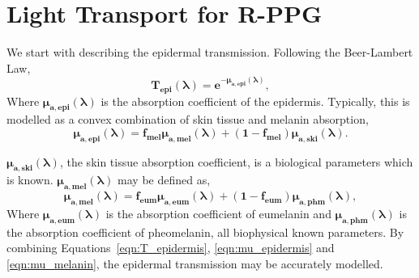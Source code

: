 \section{Light Transport for R-PPG}

We start with describing the epidermal transmission. Following the Beer-Lambert Law, 
\begin{equation} \label{eqn:T_epidermis}
    \mathbf{T_{epi}(\boldsymbol{\lambda})=e^{-\boldsymbol\mu_{a,epi}(\boldsymbol\lambda)}},
\end{equation}
Where $\mathbf{\boldsymbol\mu_{a,epi}(\boldsymbol\lambda)}$ is the absorption coefficient of the epidermis. Typically, this is modelled as a convex combination of skin tissue and melanin absorption,
\begin{equation} \label{eqn:mu_epidermis}
    \mathbf{\boldsymbol\mu_{a,epi}(\boldsymbol\lambda)=f_{mel}\boldsymbol\mu_{a,mel}(\boldsymbol\lambda)+(1-f_{mel})\boldsymbol\mu_{a,ski}(\boldsymbol\lambda)}.
\end{equation}

$\mathbf{\boldsymbol\mu_{a,ski}(\boldsymbol\lambda)}$, the skin tissue absorption coefficient, is a biological parameters which is known. $\mathbf{\boldsymbol\mu_{a,mel}(\boldsymbol\lambda)}$ may be defined as,
\begin{equation} \label{eqn:mu_melanin}
    \mathbf{\boldsymbol\mu_{a,mel}(\boldsymbol\lambda)=f_{eum}\boldsymbol\mu_{a,eum}(\boldsymbol\lambda)+(1-f_{eum})\boldsymbol\mu_{a,phm}(\boldsymbol\lambda)},
\end{equation}
Where ${\mathbf{\boldsymbol\mu_{a,eum}(\boldsymbol\lambda)}}$ is the absorption coefficient of eumelanin and $\mathbf{\boldsymbol\mu_{a,phm}(\boldsymbol\lambda)}$ is the absorption coefficient of pheomelanin, all biophysical known parameters. By combining Equations~\ref{eqn:T_epidermis}, \ref{eqn:mu_epidermis} and \ref{eqn:mu_melanin}, the epidermal transmission may be accurately modelled.

